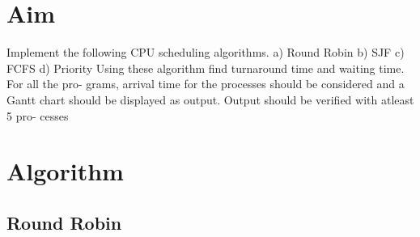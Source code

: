 
\section{Aim}
Implement the following CPU scheduling algorithms.
a) Round Robin
b) SJF
c) FCFS
d) Priority
Using these algorithm find turnaround time and waiting time. For all the pro-
grams, arrival time for the processes should be considered and a Gantt chart
should be displayed as output. Output should be verified with atleast 5 pro-
cesses

\section{Algorithm}
\subsection{Round Robin}
